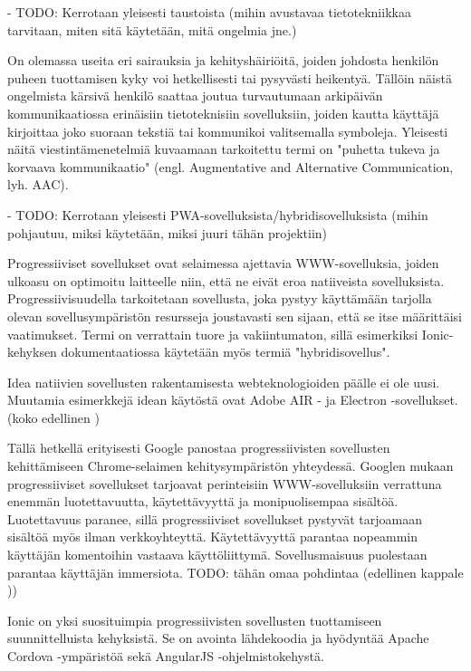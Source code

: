\documentclass[utf8]{gradu3}
\begin{document}
- TODO: Kerrotaan yleisesti taustoista (mihin avustavaa tietotekniikkaa tarvitaan, miten sitä käytetään, mitä ongelmia jne.)

On olemassa useita eri sairauksia ja kehityshäiriöitä, joiden johdosta henkilön puheen tuottamisen kyky voi hetkellisesti tai pysyvästi heikentyä. Tällöin näistä ongelmista kärsivä henkilö saattaa joutua turvautumaan arkipäivän kommunikaatiossa erinäisiin tietoteknisiin sovelluksiin, joiden kautta käyttäjä kirjoittaa joko suoraan tekstiä tai kommunikoi valitsemalla symboleja. Yleisesti näitä viestintämenetelmiä kuvaamaan tarkoitettu termi on "puhetta tukeva ja korvaava kommunikaatio" (engl. Augmentative and Alternative Communication, lyh. AAC).

- TODO: Kerrotaan yleisesti PWA-sovelluksista/hybridisovelluksista (mihin pohjautuu, miksi käytetään, miksi juuri tähän projektiin)

Progressiiviset sovellukset ovat selaimessa ajettavia WWW-sovelluksia, joiden ulkoasu on optimoitu laitteelle niin, että ne eivät eroa natiiveista sovelluksista. Progressiivisuudella tarkoitetaan sovellusta, joka pystyy käyttämään tarjolla olevan sovellusympäristön resursseja joustavasti sen sijaan, että se itse määrittäisi vaatimukset. Termi on verrattain tuore ja vakiintumaton, sillä esimerkiksi Ionic-kehyksen dokumentaatiossa käytetään myös termiä "hybridisovellus".

Idea natiivien sovellusten rakentamisesta webteknologioiden päälle ei ole uusi. Muutamia esimerkkejä idean käytöstä ovat Adobe AIR - ja Electron -sovellukset. (koko edellinen \parencite[]{escaping-tabs})

Tällä hetkellä erityisesti Google panostaa progressiivisten sovellusten kehittämiseen Chrome-selaimen kehitysympäristön yhteydessä. Googlen mukaan progressiiviset sovellukset tarjoavat perinteisiin WWW-sovelluksiin verrattuna enemmän luotettavuutta, käytettävyyttä ja monipuolisempaa sisältöä. Luotettavuus paranee, sillä progressiiviset sovellukset pystyvät tarjoamaan sisältöä myös ilman verkkoyhteyttä. Käytettävyyttä parantaa nopeammin käyttäjän komentoihin vastaava käyttöliittymä. Sovellusmaisuus puolestaan parantaa käyttäjän immersiota. TODO: tähän omaa pohdintaa (edellinen kappale \parencite[]{google-pwa-marketing}))

Ionic on yksi suosituimpia progressiivisten sovellusten tuottamiseen suunnittelluista kehyksistä. Se on avointa lähdekoodia ja hyödyntää Apache Cordova -ympäristöä sekä AngularJS -ohjelmistokehystä.
\end{document}
